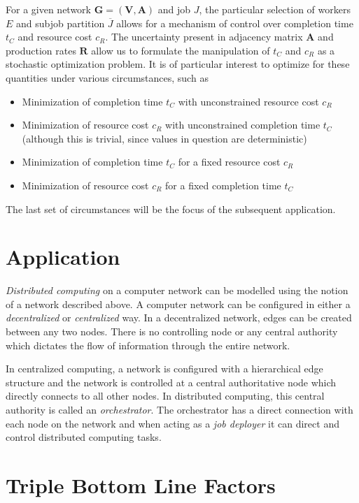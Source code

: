 \documentclass[../mthe-493-project-proposal.tex]{subfiles}
\begin{document}
    For a given network $\mathbf{G} = (\mathbf{V}, \mathbf{A})$ and job $J$, the particular selection of workers $E$ and subjob partition $\overline{J}$ allows for a mechanism of control over completion time $t_C$ and resource cost $c_R$. The uncertainty present in adjacency matrix $\mathbf{A}$ and production rates $\mathbf{R}$ allow us to formulate the manipulation of $t_C$ and $c_R$ as a stochastic optimization problem. It is of particular interest to optimize for these quantities under various circumstances, such as
    
    \begin{itemize}
        \item Minimization of completion time $t_C$ with unconstrained resource cost $c_R$
        \item Minimization of resource cost $c_R$ with unconstrained completion time $t_C$ (although this is trivial, since values in question are deterministic)
        \item Minimization of completion time $t_C$ for a fixed resource cost $c_R$
        \item Minimization of resource cost $c_R$ for a fixed completion time $t_C$
    \end{itemize}
    
    The last set of circumstances will be the focus of the subsequent application.

    \section{Application}
    
    \textit{Distributed computing} on a computer network can be modelled using the notion of a network described above. A computer network can be configured in either a \textit{decentralized} or \textit{centralized} way. In a decentralized network, edges can be created between any two nodes. There is no controlling node or any central authority which dictates the flow of information through the entire network.
    
    In centralized computing, a network is configured with a hierarchical edge structure and the network is controlled at a central authoritative node which directly connects to all other nodes. In distributed computing, this central authority is called an \textit{orchestrator}. The orchestrator has a direct connection with each node on the network and when acting as a \textit{job deployer} it can direct and control distributed computing tasks.

    \section{Triple Bottom Line Factors}
    \blindtext
\end{document}
